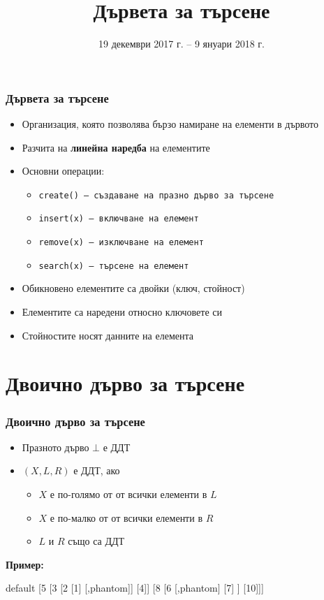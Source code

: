 \documentclass{beamer}
\title{Дървета за търсене}
\date[19.12.2017--9.01.2018]{19 декември 2017 г. -- 9 януари 2018 г.}
\newcommand{\samplebinordtree}{%
  \begin{forest}
    default [5 [3 [2 [1] [,phantom]] [4]] [8 [6 [,phantom] [7] ] [10]]]
  \end{forest}%
}
\begin{document}
\begin{frame}
  \titlepage
\end{frame}

\begin{frame}
  \frametitle{Дървета за търсене}
  \begin{itemize}
  \item Организация, която позволява бързо намиране на елементи в дървото
  \item Разчита на \textbf{линейна наредба} на елементите
  \item Основни операции:
    \begin{itemize}
    \item \tt{create()} --- създаване на празно дърво за търсене
    \item \tt{insert(x)} --- включване на елемент
    \item \tt{remove(x)} --- изключване на елемент
    \item \tt{search(x)} --- търсене на елемент
    \end{itemize}
  \item Обикновено елементите са двойки (ключ, стойност)
  \item Елементите са наредени относно ключовете си
  \item Стойностите носят данните на елемента
  \end{itemize}
\end{frame}

\section{Двоично дърво за търсене}

\begin{frame}
  \frametitle{Двоично дърво за търсене}
  \begin{definition}
    \begin{itemize}
    \item Празното дърво $\bot$ е ДДТ
    \item $(X,L,R)$ е ДДТ, ако
      \begin{itemize}
      \item $X$ е по-голямо от от всички елементи в $L$
      \item $X$ е по-малко от от всички елементи в $R$
      \item $L$ и $R$ също са ДДТ
      \end{itemize}
    \end{itemize}
  \end{definition}
  \pause
  \textbf{Пример:}
  \vspace{-1em}
  \begin{center}
    \small
    \samplebinordtree
  \end{center}
\end{frame}
\end{document}
